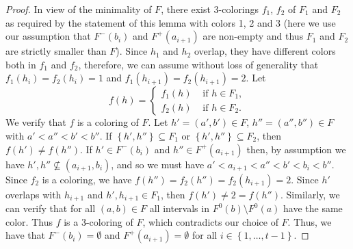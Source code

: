 \documentclass{article}
\theoremstyle{definition}
\begin{document}
\begin{proof}
        In view of the minimality of
        $F$, there exist 3-colorings
        $f_1$, $f_2$ of $F_1$ and $F_2$ as required
        by the statement of this lemma
        with colors 1, 2 and 3 (here
        we use our assumption that
        $F^{-}\left(b_{i}\right)$ 
        and $F^{+}\left(a_{i+1}\right)$ 
        are non-empty and thus
        $F_{1}$ and $F_{2}$ are
        strictly smaller than $F$).
        Since $h_1$ and $h_2$ overlap,
        they have different colors
        both in $f_1$ and $f_2$, therefore,
        we can assume without loss of 
        generality that
        $f_1\left(h_{i}\right) = f_2\left(h_{i}\right) = 1$
        and $f_{1}\left(h_{i+1}\right) = 
        f_2\left(h_{i+1}\right) = 2$.
        Let
        \begin{equation*}
            f\left(h\right) = 
            \begin{cases}
                f_1\left(h\right) &\text{ if } h \in F_1, \\
                f_2\left(h\right) &\text{ if } h \in F_{2}.
            \end{cases}
        \end{equation*}
        We verify that $f$ 
        is a coloring of $F$. Let
        $h' = \left(a', b'\right) \in F$,
        $h'' = \left(a'', b''\right) \in F$
        with $a' < a'' < b' < b''$.
        If $\left\{h', h''\right\} \subseteq F_1$ 
        or $\left\{h', h''\right\} \subseteq F_2$,
        then $f\left(h'\right) \neq 
        f\left(h''\right)$.
        If $h' \in F^{-}\left(b_{i}\right)$ 
        and $h'' \in F^{+}\left(a_{i+1}\right)$
        then, by assumption
        we have
        $h', h'' \not \subseteq \left(a_{i+1}, b_{i}\right)$,
        and so we must have $a' < a_{i+1} < 
        a'' < b' < b_{i} < b''$. 
        Since $f_2$ is a coloring,
        we have $f\left(h''\right) =
        f_2\left(h''\right) =
        f_2\left(h_{i+1}\right) = 2$.
        Since $h'$ overlaps with $h_{i+1}$
        and $h', h_{i+1}
        \in F_1$, then $f\left(h'\right)
        \neq 2 = f\left(h''\right)$.
        Similarly, we can verify
        that for all $\left(a, b\right) \in F$
        all intervals in $F^{0}\left(b\right)
        \setminus F^{0}\left(a\right)$
        have the same color. 
        Thus
        $f$ is a 3-coloring of $F$,
        which contradicts our choice of $F$.
        Thus, we have that
        $F^{-}\left(b_{i}\right) = \emptyset$ and
        $F^{+}\left(a_{i+1}\right) = \emptyset$ 
        for all $i \in \left\{1, \ldots, t-1\right\}$.


\end{proof}
\end{document}
